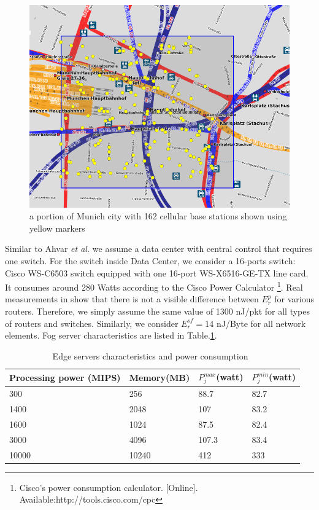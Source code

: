 \documentclass[twocolumn]{article}
\begin{document}
\begin{figure}[!htbp]
\centering
\includegraphics[clip, trim=0cm 0cm 0cm 0cm, width=\columnwidth]{figures/pdf/fig3-sim-1.4km2-bs1.PNG}
\caption{a portion of Munich city with 162 cellular base stations shown using yellow markers}
\label{fig:APs}
\end{figure}

\par Similar to Ahvar \textit{et al.}\cite{ahvar2019estimating} we assume a data center with central control that requires one switch. For the switch inside Data Center, we consider a 16-ports switch: Cisco WS-C6503 switch equipped with one 16-port WS-X6516-GE-TX line card. It consumes around 280 Watts according to the Cisco Power Calculator \footnote{Cisco’s power consumption calculator. [Online]. Available:http://tools.cisco.com/cpc}. Real measurements in\cite{vishwanath2014modeling,sivaraman2011profiling} show that there is not a visible difference between $E^{p}_r$ for various routers. Therefore, we simply assume the same value of 1300 nJ/pkt for all types of routers and switches. Similarly, we consider $E^{sf}_r=14$ nJ/Byte for all network elements. Fog server characteristics are listed in Table.\ref{tab:1}.

\begin{table}[tb]
\setlength\tabcolsep{0pt}
\scriptsize\centering
\caption {Edge servers characteristics and power consumption~\cite{gupta2017ifogsim,taneja2017resource}}\label{tab:1}
\smallskip
\begin{tabular*}{7cm}{|p{2cm}p{2cm}p{1.5cm}p{1.5cm}|}
\hline
Processing power (MIPS)&Memory(MB)&$P^{max}_{j}$(watt)&$P^{min}_{j}$(watt)\\
\hline
    300&256&88.7&82.7\\
    1400&2048&107&83.2\\
   	1600&1024&87.5&82.4\\
   	3000&4096&107.3&83.4\\
   	10000&10240&412&333\\
\hline
\end{tabular*}
\end{table}
\end{document}
